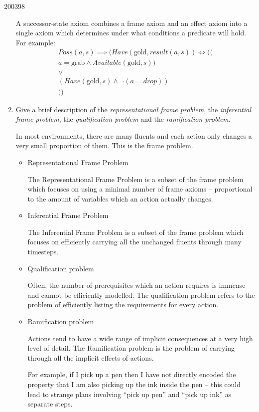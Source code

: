 \documentclass[10pt,\jkfside,a4paper]{article}
\begin{document}
\begin{examquestion}{2003}{9}{8}
\begin{enumerate}[label=(\alph*)]
A successor-state axiom combines a frame axiom and an effect axiom into a
single axiom which determines under what conditions a predicate will hold.
For example:
\begin{gather*}
Poss(a, s) \implies (Have(\text{gold}, result(a, s)) \iff ((\\
a = \text{grab}
\wedge Available(\text{gold}, s)) \\
\vee \\
(Have(\text{gold}, s) \wedge \neg (a = drop)) \\
))
\end{gather*}

\item Give a brief description of the \textit{representational frame problem},
the \textit{inferential frame problem}, the \textit{qualification problem}
and the \textit{ramification problem}.

In most environments, there are many fluents and each action only changes a
very small proportion of them. This is the frame problem.

\begin{itemize}

\item Representational Frame Problem

The Representational Frame Problem is a subset of the frame problem which
focuses on using a minimal number of frame axioms -- proportional to the
amount of variables which an action actually changes.

\item Inferential Frame Problem

The Inferential Frame Problem is a subset of the frame problem which focuses
on efficiently carrying all the unchanged fluents through many timesteps.

\item Qualification problem

Often, the number of prerequisites which an action requires is immense and
cannot be efficiently modelled. The qualification problem refers to the
problem of efficiently listing the requirements for every action.

\item Ramification problem

Actions tend to have a wide range of implicit consequences at a very high
level of detail. The Ramification problem is the problem of carrying
through all the implicit effects of actions.

For example, if I pick up a pen then I have not directly encoded the
property that I am also picking up the ink inside the pen -- this could lead
to strange plans involving ``pick up pen'' and ``pick up ink'' as separate
steps.

\end{itemize}

\end{enumerate}

\end{examquestion}
\end{document}
